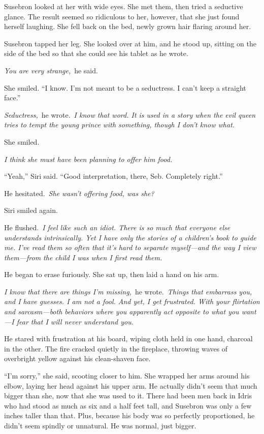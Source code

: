 Susebron looked at her with wide eyes. She met them, then tried a seductive glance. The result seemed so ridiculous to her, however, that she just found herself laughing. She fell back on the bed, newly grown hair flaring around her.

Susebron tapped her leg. She looked over at him, and he stood up, sitting on the side of the bed so that she could see his tablet as he wrote.

\textit{You are very strange,}~he said.

She smiled. “I know. I’m not meant to be a seductress. I can’t keep a straight face.”

\textit{Seductress,}~he wrote.~\textit{I know that word. It is used in a story when the evil queen tries to tempt the young prince with something, though I don’t know what.}

She smiled.

\textit{I think she must have been planning to offer him food.}

“Yeah,” Siri said. “Good interpretation, there, Seb. Completely right.”

He hesitated.~\textit{She wasn’t offering food, was she?}

Siri smiled again.

He flushed.~\textit{I feel like such an idiot. There is so much that everyone else understands intrinsically. Yet I have only the stories of a children’s book to guide me. I’ve read them so often that it’s hard to separate myself—and the way I view them—from the child I was when I first read them.}

He began to erase furiously. She sat up, then laid a hand on his arm.

\textit{I know that there are things I’m missing,}~he wrote.~\textit{Things that embarrass you, and I have guesses. I am not a fool. And yet, I get frustrated. With your flirtation and sarcasm—both behaviors where you apparently act opposite to what you want—I fear that I will never understand you.}

He stared with frustration at his board, wiping cloth held in one hand, charcoal in the other. The fire cracked quietly in the fireplace, throwing waves of overbright yellow against his clean-shaven face.

“I’m sorry,” she said, scooting closer to him. She wrapped her arms around his elbow, laying her head against his upper arm. He actually didn’t seem that much bigger than she, now that she was used to it. There had been men back in Idris who had stood as much as six and a half feet tall, and Susebron was only a few inches taller than that. Plus, because his body was so perfectly proportioned, he didn’t seem spindly or unnatural. He was normal, just bigger.

